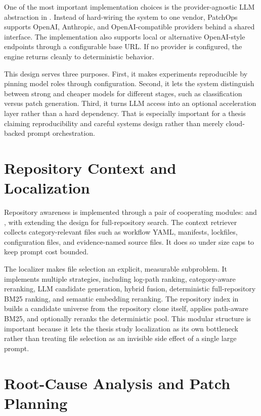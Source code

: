 One of the most important implementation choices is the provider-agnostic LLM abstraction in
. Instead of hard-wiring the system to one vendor, PatchOps supports OpenAI,
Anthropic, and OpenAI-compatible providers behind a shared interface. The implementation also supports local or
alternative OpenAI-style endpoints through a configurable base URL. If no provider is configured, the engine
returns cleanly to deterministic behavior.

This design serves three purposes. First, it makes experiments reproducible by pinning model roles through
configuration. Second, it lets the system distinguish between strong and cheaper models for different stages,
such as classification versus patch generation. Third, it turns LLM access into an optional acceleration layer
rather than a hard dependency. That is especially important for a thesis claiming reproducibility and careful
systems design rather than merely cloud-backed prompt orchestration.

\section{Repository Context and Localization}

Repository awareness is implemented through a pair of cooperating modules:
 and , with  extending the design for
full-repository search. The context retriever collects category-relevant files such as workflow YAML,
manifests, lockfiles, configuration files, and evidence-named source files. It does so under size caps to keep
prompt cost bounded.

The localizer makes file selection an explicit, measurable subproblem. It implements multiple strategies,
including log-path ranking, category-aware reranking, LLM candidate generation, hybrid fusion, deterministic
full-repository BM25 ranking, and semantic embedding reranking. The repository index in
 builds a candidate universe from the repository clone itself, applies path-aware BM25,
and optionally reranks the deterministic pool. This modular structure is important because it lets the thesis
study localization as its own bottleneck rather than treating file selection as an invisible side effect of a
single large prompt.

\section{Root-Cause Analysis and Patch Planning}

